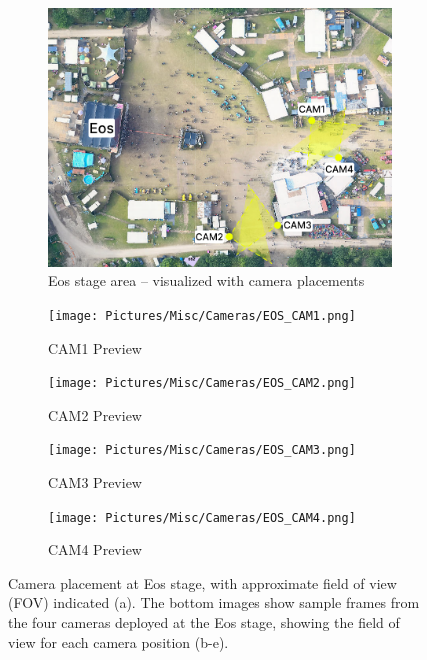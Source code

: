 \begin{figure}
  \centering
  \begin{subfigure}{0.9\textwidth}
    \centering
    \includegraphics[width=\textwidth]{Pictures/Figures/eos_cameras.png}
    \caption{Eos stage area -- visualized with camera placements}
  \end{subfigure}
  \begin{subfigure}{0.42\textwidth}
    \centering
    \texttt{[image: Pictures/Misc/Cameras/EOS\_CAM1.png]}
    \caption{CAM1 Preview}
  \end{subfigure}%
  \hspace{0.06\textwidth}
  \begin{subfigure}{0.42\textwidth}
    \centering
    \texttt{[image: Pictures/Misc/Cameras/EOS\_CAM2.png]}
    \caption{CAM2 Preview}
  \end{subfigure}

  \begin{subfigure}{0.42\textwidth}
    \centering
    \texttt{[image: Pictures/Misc/Cameras/EOS\_CAM3.png]}
    \caption{CAM3 Preview}
  \end{subfigure}%
  \hspace{0.06\textwidth}
  \begin{subfigure}{0.42\textwidth}
    \centering
    \texttt{[image: Pictures/Misc/Cameras/EOS\_CAM4.png]}
    \caption{CAM4 Preview}
  \end{subfigure}

  \caption{Camera placement at Eos stage, with approximate field of view (FOV) indicated (a). The bottom images show sample frames from the four cameras deployed at the Eos stage, showing the field of view for each camera position (b-e).}
  \label{fig:eos_cameras}

\end{figure}


